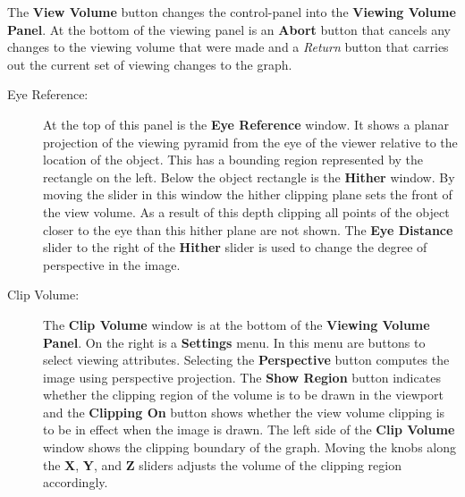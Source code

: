 The {\bf View Volume} button changes the control-panel into
the {\bf Viewing Volume Panel}.
At the bottom of the viewing panel is an {\bf Abort} button that
cancels any changes to the viewing volume that were made and a
{\it Return} button that carries out the current set of
viewing changes to the graph.
%
%
%
\begin{description}
%
\item[Eye Reference:]  At the top of this panel is the
{\bf Eye Reference} window.
It shows a planar projection of the viewing pyramid from the eye
of the viewer relative to the location of the object.
This has a bounding region represented by the rectangle on the
left.
Below the object rectangle is the {\bf Hither} window.
By moving the slider in this window the hither clipping plane sets
the front of the view volume.
As a result of this depth clipping all points of the object closer
to the eye than this hither plane are not shown.
The {\bf Eye Distance} slider to the right of the {\bf Hither}
slider is used to change the degree of perspective in the image.
%
\item[Clip Volume:]  The {\bf Clip Volume} window is at the
bottom of the {\bf Viewing Volume Panel}.
On the right is a {\bf Settings} menu.
In this menu are buttons to select viewing attributes.
Selecting the {\bf Perspective} button computes the image using
perspective projection.
The {\bf Show Region} button indicates whether the clipping region
of the
volume is to be drawn in the viewport and the {\bf Clipping On}
button shows whether the view volume clipping is to be in effect
when the image
is drawn.
The left side of the {\bf Clip Volume} window shows the clipping
boundary of the graph.
Moving the knobs along the {\bf X}, {\bf Y}, and {\bf Z} sliders
adjusts the volume of the clipping region accordingly.
\end{description}

